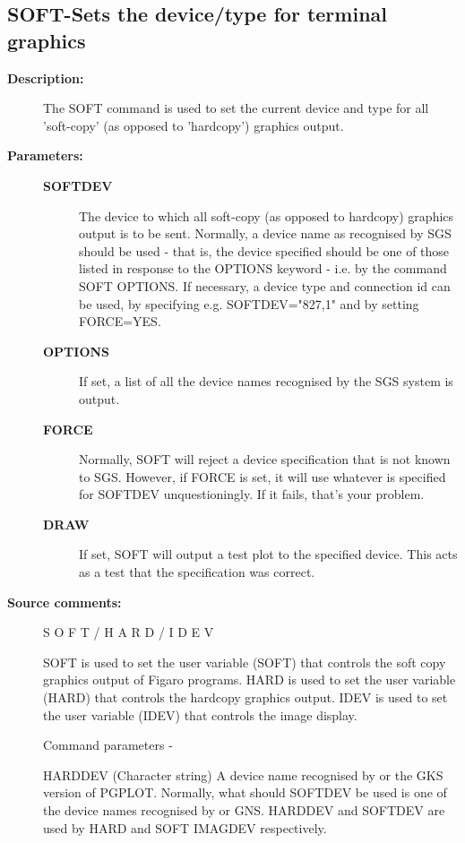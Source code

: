 \subsection{SOFT-\label{SOFT}Sets the device/type for terminal graphics}
\begin{description}

\item [\textbf{Description:}]
 The SOFT command is used to set the current device and type
 for all 'soft-copy' (as opposed to 'hardcopy') graphics output.

\item [\textbf{Parameters:}]
\begin{description}
\item [\textbf{SOFTDEV}]
 The device to which all
 soft-copy (as opposed to hardcopy) graphics output
 is to be sent.  Normally, a device name as recognised
 by SGS should be used - that is, the device specified
 should be one of those listed in response to the
 OPTIONS keyword - i.e. by the command SOFT OPTIONS.
 If necessary, a device type and connection id can
 be used, by specifying e.g. SOFTDEV="827,1" and by
 setting FORCE=YES.
\item [\textbf{OPTIONS}]
 If set, a list of all the device names recognised
 by the SGS system is output.
\item [\textbf{FORCE}]
 Normally, SOFT will reject a device specification
 that is not known to SGS.  However, if FORCE is set,
 it will use whatever is specified for SOFTDEV
 unquestioningly.  If it fails, that's your problem.
\item [\textbf{DRAW}]
 If set, SOFT will output a test plot to the specified
 device.  This acts as a test that the specification
 was correct.
\end{description}

\item [\textbf{Source comments:}]
\begin{terminalv}
 S O F T  /  H A R D  /  I D E V

 SOFT is used to set the user variable (SOFT) that controls
 the soft copy graphics output of Figaro programs.  HARD is
 used to set the user variable (HARD) that controls the
 hardcopy graphics output. IDEV is used to set the user variable
 (IDEV) that controls the image display.

 Command parameters -

 HARDDEV  (Character string) A device name recognised by
   or     the GKS version of PGPLOT.  Normally, what should
 SOFTDEV  be used is one of the device names recognised by
   or     GNS.  HARDDEV and SOFTDEV are used by HARD and SOFT
 IMAGDEV  respectively.


\end{terminalv}
\end{description}
